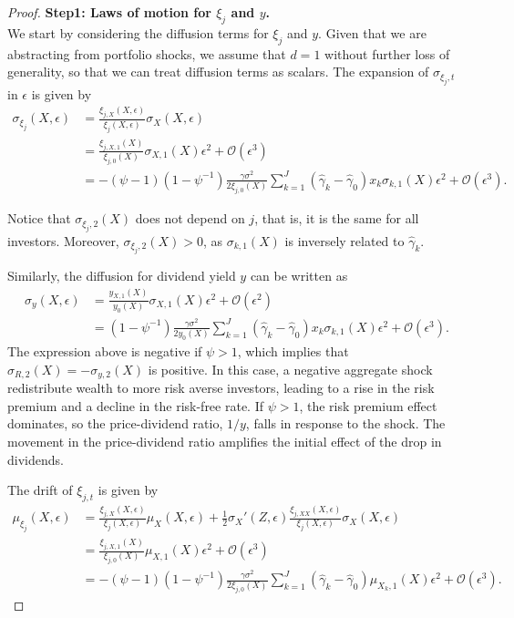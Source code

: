 \begin{proof}
\noindent\textbf{Step1: Laws of motion for $\xi_j$ and $y$.}\\
We start by considering the diffusion terms for $\xi_j$ and $y$. Given that we are abstracting from portfolio shocks, we assume that $d=1$ without further loss of generality, so that we can treat diffusion terms as scalars. The expansion of $\sigma_{\xi_j,t}$ in $\epsilon$ is given by
\begin{align}
    \sigma_{\xi_j}(X,\epsilon) &= \frac{\xi_{j,X}(X,\epsilon)}{\xi_j(X,\epsilon)} \sigma_{X}(X,\epsilon) \nonumber\\
    &= \frac{\xi_{j,X,1}(X)}{\xi_{j,0}(X)} \sigma_{X,1}(X) \epsilon^2+\mathcal{O}(\epsilon^3)\nonumber\\
    &= -(\psi-1)\left(1-\psi^{-1}\right)\frac{\gamma \sigma^2}{2 \xi_{j,0}(X)} \sum_{k=1}^J \left( \hat{\gamma}_k - \hat{\gamma}_0  \right) x_k\sigma_{k,1}(X) \epsilon^2 + \mathcal{O}(\epsilon^3).
\end{align}

Notice that $\sigma_{\xi_j,2}(X)$  does not depend on $j$, that is, it is the same for all investors. Moreover, $\sigma_{\xi_{j},2}(X)> 0$, as $\sigma_{k,1}(X)$ is inversely related to $\hat{\gamma}_k$. 

Similarly, the diffusion for dividend yield $y$ can be written as
\begin{align}\label{eq:sig-y2}
    \sigma_{y}(X,\epsilon) &= \frac{y_{X,1}(X)}{y_{0}(X)} \sigma_{X,1}(X) \epsilon^2+\mathcal{O}(\epsilon^2)\nonumber\\
    &= \left(1-\psi^{-1}\right)\frac{\gamma\sigma^2}{2 y_{0}(X)} \sum_{k=1}^J \left( \hat{\gamma}_k - \hat{\gamma}_0  \right) x_k \sigma_{k,1}(X)  \epsilon^2 + \mathcal{O}(\epsilon^3).
\end{align}
The expression above is negative if $\psi>1$, which implies that $\sigma_{R,2}(X) = -\sigma_{y,2}(X)$ is positive. In this case, a negative aggregate shock redistribute wealth to more risk averse investors, leading to a rise in the risk premium and a decline in the risk-free rate. If $\psi>1$, the risk premium effect dominates, so the price-dividend ratio, $ 1/y $, falls in response to the shock. The movement in the price-dividend ratio amplifies the initial effect of the drop in dividends. 

The drift of $\xi_{j,t}$ is given by
\begin{align}
    \mu_{\xi_j}(X,\epsilon) &= \frac{\xi_{j,X}(X,\epsilon)}{\xi_j(X,\epsilon)} \mu_{X}(X,\epsilon)+ \frac{1}{2}  \sigma_{X}'(Z,\epsilon) \frac{\xi_{j,XX}(X,\epsilon)}{\xi_{j}(X,\epsilon)} \sigma_{X}(X,\epsilon)\nonumber\\
    &=  \frac{\xi_{j,X,1}(X)}{\xi_{j,0}(X)} \mu_{X,1}(X)\epsilon^2+\mathcal{O}(\epsilon^3)\nonumber\\
    &=  -(\psi-1)\left(1-\psi^{-1}\right)\frac{\gamma \sigma^2}{2 \xi_{j,0}(X)} \sum_{k=1}^J \left( \hat{\gamma}_k - \hat{\gamma}_0  \right) \mu_{X_k,1}(X) \epsilon^2 + \mathcal{O}(\epsilon^3).
\end{align}


\end{proof}
